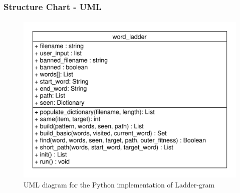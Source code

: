 \documentclass[12pt, a4]{report}
\begin{document}
	\pagebreak

	\subsubsection{Structure Chart - UML}
	\paragraph{}

	\begin{figure}[!h]
	\centering
	\includegraphics[scale=0.7]{UML}
	\caption{UML diagram for the Python implementation of Ladder-gram}
	\end{figure}
\end{document}
